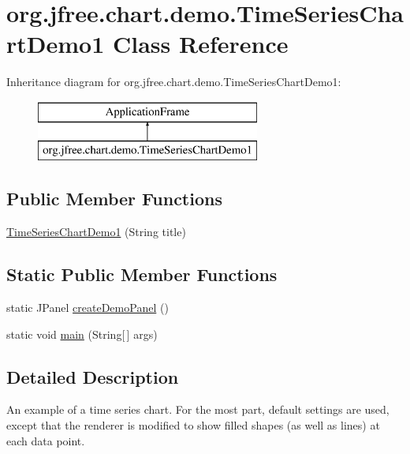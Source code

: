 \hypertarget{classorg_1_1jfree_1_1chart_1_1demo_1_1_time_series_chart_demo1}{}\section{org.\+jfree.\+chart.\+demo.\+Time\+Series\+Chart\+Demo1 Class Reference}
\label{classorg_1_1jfree_1_1chart_1_1demo_1_1_time_series_chart_demo1}
Inheritance diagram for org.\+jfree.\+chart.\+demo.\+Time\+Series\+Chart\+Demo1\+:\begin{figure}[H]
\begin{center}
\leavevmode
\includegraphics[height=2.000000cm]{classorg_1_1jfree_1_1chart_1_1demo_1_1_time_series_chart_demo1}
\end{center}
\end{figure}
\subsection*{Public Member Functions}
\begin{DoxyCompactItemize}
\item 
\mbox{\hyperlink{classorg_1_1jfree_1_1chart_1_1demo_1_1_time_series_chart_demo1_a946a95f0b786bc878f5562518b8965ab}{Time\+Series\+Chart\+Demo1}} (String title)
\end{DoxyCompactItemize}
\subsection*{Static Public Member Functions}
\begin{DoxyCompactItemize}
\item 
static J\+Panel \mbox{\hyperlink{classorg_1_1jfree_1_1chart_1_1demo_1_1_time_series_chart_demo1_aa09dd3c8266fd837ba52b0cc24387388}{create\+Demo\+Panel}} ()
\item 
static void \mbox{\hyperlink{classorg_1_1jfree_1_1chart_1_1demo_1_1_time_series_chart_demo1_a7ddf9e3f43f8ad1236f71447089cbfdd}{main}} (String\mbox{[}$\,$\mbox{]} args)
\end{DoxyCompactItemize}


\subsection{Detailed Description}
An example of a time series chart. For the most part, default settings are used, except that the renderer is modified to show filled shapes (as well as lines) at each data point. 

